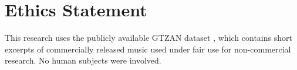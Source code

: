 \documentclass{article}
\begin{document}
\section{Ethics Statement}

This research uses the publicly available GTZAN dataset \cite{Tzanetakis2002}, which contains short excerpts of commercially released music used under fair use for non-commercial research. No human subjects were involved.

\FloatBarrier

\end{document}
